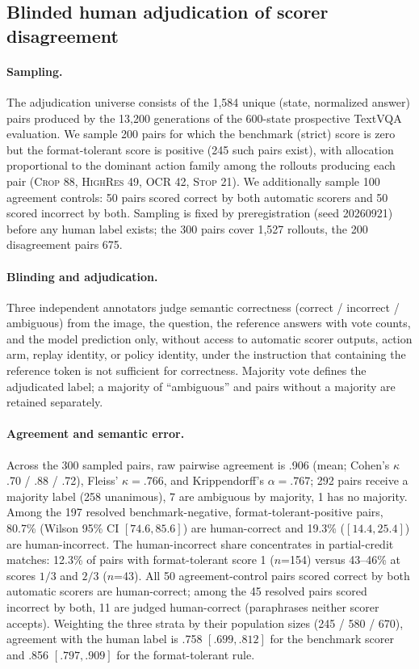 \documentclass[10pt]{article}
\begin{document}
\subsection{Blinded human adjudication of scorer disagreement}
\label{sec:results:adjudication}

\paragraph{Sampling.}
The adjudication universe consists of the 1,584 unique (state, normalized
answer) pairs produced by the 13,200 generations of the 600-state
prospective TextVQA evaluation. We sample 200 pairs for which the benchmark
(strict) score is zero but the format-tolerant score is positive (245 such
pairs exist), with allocation proportional to the dominant action family
among the rollouts producing each pair (\textsc{Crop} 88, \textsc{HighRes}
49, \textsc{OCR} 42, \textsc{Stop} 21). We additionally sample 100 agreement
controls: 50 pairs scored correct by both automatic scorers and 50 scored
incorrect by both. Sampling is fixed by preregistration (seed 20260921)
before any human label exists; the 300 pairs cover 1,527 rollouts, the 200
disagreement pairs 675.

\paragraph{Blinding and adjudication.}
Three independent annotators judge semantic correctness (correct /
incorrect / ambiguous) from the image, the question, the reference answers
with vote counts, and the model prediction only, without access to
automatic scorer outputs, action arm, replay identity, or policy identity,
under the instruction that containing the reference token is not sufficient
for correctness. Majority vote defines the adjudicated label; a majority of
``ambiguous'' and pairs without a majority are retained separately.

\paragraph{Agreement and semantic error.}
Across the 300 sampled pairs, raw pairwise agreement is .906 (mean; Cohen's
$\kappa$ .70 / .88 / .72), Fleiss' $\kappa=.766$, and Krippendorff's
$\alpha=.767$; 292 pairs receive a majority label (258 unanimous), 7 are
ambiguous by majority, 1 has no majority. Among the 197 resolved
benchmark-negative, format-tolerant-positive pairs, 80.7\% (Wilson 95\% CI
$[74.6, 85.6]$) are human-correct and 19.3\% ($[14.4, 25.4]$) are
human-incorrect. The human-incorrect share concentrates in partial-credit
matches: 12.3\% of pairs with format-tolerant score 1 ($n$=154) versus
43--46\% at scores $1/3$ and $2/3$ ($n$=43). All 50 agreement-control pairs
scored correct by both automatic scorers are human-correct; among the 45
resolved pairs scored incorrect by both, 11 are judged human-correct
(paraphrases neither scorer accepts). Weighting the three strata by their
population sizes (245 / 580 / 670), agreement with the human label is
.758 $[.699, .812]$ for the benchmark scorer and .856 $[.797, .909]$ for the
format-tolerant rule.
\end{document}

